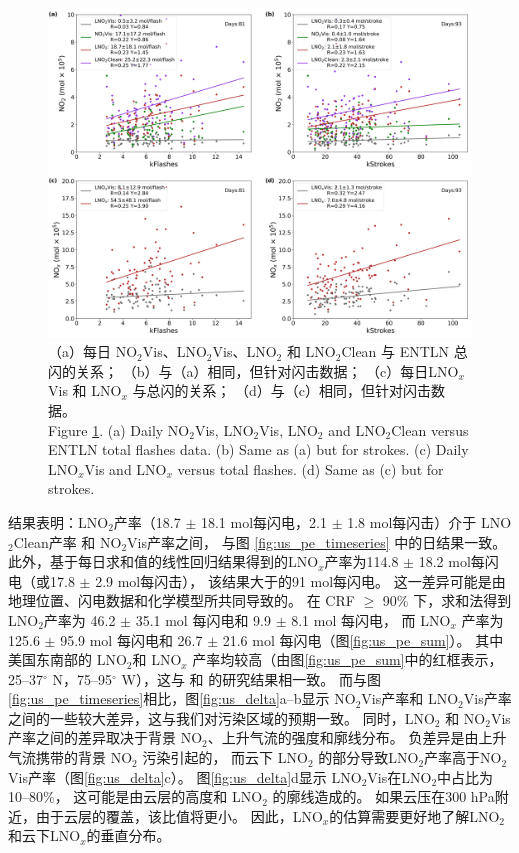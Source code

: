 \begin{figure}[!htbp]
    \includegraphics[width=13cm]{./figures/us_pe_linear.png}
    \caption{（a）每日 NO$_2$Vis、LNO$_2$Vis、LNO$_2$ 和 LNO$_2$Clean 与 ENTLN 总闪的关系；
    （b）与（a）相同，但针对闪击数据；
    （c）每日LNO$_x$Vis 和 LNO$_x$ 与总闪的关系；
    （d）与（c）相同，但针对闪击数据。\\
    Figure \ref{fig:us_pe_linear}.
    (a) Daily NO$_2$Vis, LNO$_2$Vis, LNO$_2$ and LNO$_2$Clean versus ENTLN total flashes data.
    (b) Same as (a) but for strokes.
    (c) Daily LNO$_x$Vis and LNO$_x$ versus total flashes.
    (d) Same as (c) but for strokes.}
    \label{fig:us_pe_linear}
\end{figure}

结果表明：LNO$_2$产率（18.7 $\pm$ 18.1 mol每闪电，2.1 $\pm$ 1.8 mol每闪击）介于 LNO$_2$Clean产率 和 NO$_2$Vis产率之间，
与图 \ref{fig:us_pe_timeseries} 中的日结果一致。
此外，基于每日求和值的线性回归结果得到的LNO$_x$产率为114.8 $\pm$ 18.2 mol每闪电（或17.8 $\pm$ 2.9 mol每闪击），
该结果大于\citet{Pickering.2016}的91 mol每闪电。
这一差异可能是由地理位置、闪电数据和化学模型所共同导致的。
在 CRF $\geq$ 90\% 下，求和法得到LNO$_2$产率为 46.2 $\pm$ 35.1 mol 每闪电和 9.9 $\pm$ 8.1 mol 每闪电，
而 LNO$_x$ 产率为 125.6 $\pm$ 95.9 mol 每闪电和 26.7 $\pm$ 21.6 mol 每闪电（图\ref{fig:us_pe_sum}）。
其中美国东南部的 LNO$_2$和 LNO$_x$ 产率均较高（由图\ref{fig:us_pe_sum}中的红框表示，25--37$^{\circ}$ N，75--95$^{\circ}$ W），这与\citet{Lapierre.2020} 和 \citet{Bucsela.2019}的研究结果相一致。
而与图\ref{fig:us_pe_timeseries}相比，图\ref{fig:us_delta}a--b显示
NO$_2$Vis产率和 LNO$_2$Vis产率之间的一些较大差异，这与我们对污染区域的预期一致。
同时，LNO$_2$ 和 NO$_2$Vis产率之间的差异取决于背景 NO$_2$、上升气流的强度和廓线分布。
负差异是由上升气流携带的背景 NO$_2$ 污染引起的，
而云下 LNO$_2$ 的部分导致LNO$_2$产率高于NO$_2$Vis产率（图\ref{fig:us_delta}c）。
图\ref{fig:us_delta}d显示 LNO$_2$Vis在LNO$_2$中占比为 10--80\%，
这可能是由云层的高度和 LNO$_2$ 的廓线造成的。
如果云压在300 hPa附近，由于云层的覆盖，该比值将更小。
因此，LNO$_x$的估算需要更好地了解LNO$_2$和云下LNO$_x$的垂直分布。


